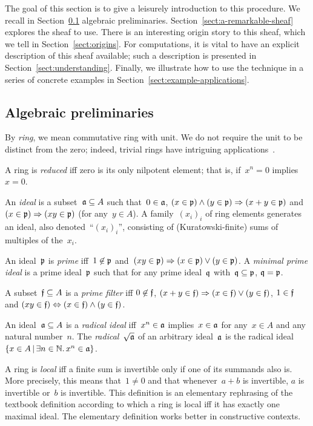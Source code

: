\documentclass{ws-rv9x6}
\begin{document}
{The goal of this section is to give a leisurely introduction to this procedure.
We recall in Section~\ref{sect:algebraic-preliminaries} algebraic
preliminaries. Section~\ref{sect:a-remarkable-sheaf} explores the sheaf to use.
There is an interesting origin story to this sheaf, which we tell in
Section~\ref{sect:origins}. For computations, it is vital to have an explicit
description of this sheaf available; such a description is presented in
Section~\ref{sect:understanding}. Finally, we illustrate how to use the technique in
a series of concrete examples in Section~\ref{sect:example-applications}.


\subsection{Algebraic preliminaries}
\label{sect:algebraic-preliminaries}

By \emph{ring}, we mean commutative ring with unit. We do not require the unit
to be distinct from the zero; indeed, trivial rings have intriguing
applications~\cite{richman:trivial-rings}.

A ring is \emph{reduced} iff zero is its only nilpotent element; that is, if~$x^n = 0$
implies~$x = 0$.

An \emph{ideal} is a subset~$\mathfrak{a} \subseteq A$ such that~$0 \in \mathfrak{a}$, $(x \in
\mathfrak{p}) \wedge (y \in \mathfrak{p}) \Rightarrow (x + y \in \mathfrak{p})$ and $(x \in
\mathfrak{p}) \Rightarrow (xy \in \mathfrak{p})$ (for any~$y \in A$). A family~$(x_i)_i$ of
ring elements generates an ideal, also denoted~``$(x_i)_i$'', consisting of
(Kuratowski-finite) sums of multiples of the~$x_i$.

An ideal~$\mathfrak{p}$ is \emph{prime} iff~$1 \not\in \mathfrak{p}$ and~$(xy
\in \mathfrak{p}) \Rightarrow (x \in \mathfrak{p}) \vee (y \in \mathfrak{p})$.
A \emph{minimal prime ideal} is a prime ideal~$\mathfrak{p}$ such that for any prime
ideal~$\mathfrak{q}$ with~$\mathfrak{q} \subseteq \mathfrak{p}$, $\mathfrak{q} = \mathfrak{p}$.

A subset~$\mathfrak{f} \subseteq A$ is a \emph{prime filter} iff
$0 \not\in \mathfrak{f}$, $(x + y \in \mathfrak{f}) \Rightarrow (x \in \mathfrak{f}) \vee (y \in
\mathfrak{f})$, $1 \in \mathfrak{f}$ and $(xy \in \mathfrak{f}) \Leftrightarrow (x \in \mathfrak{f}) \wedge (y
\in \mathfrak{f})$.

An ideal~$\mathfrak{a} \subseteq A$ is a \emph{radical ideal} iff~$x^n \in \mathfrak{a}$
implies~$x \in \mathfrak{a}$ for any~$x \in A$ and any natural number~$n$. The
\emph{radical}~$\sqrt{\mathfrak{a}}$ of an arbitrary ideal~$\mathfrak{a}$ is the radical
ideal~$\{ x \in A \,|\, \exists n \in \mathbb{N}\mathpunct{.} x^n \in \mathfrak{a} \}$.

A ring is \emph{local} iff a finite sum is invertible only if one of its
summands also is. More precisely, this means that~$1 \neq 0$ and that
whenever~$a + b$ is invertible, $a$ is invertible or~$b$ is invertible.
This definition is an elementary rephrasing of the textbook definition
according to which a ring is local iff it has exactly one maximal ideal. The
elementary definition works better in constructive contexts.

}
\end{document}
